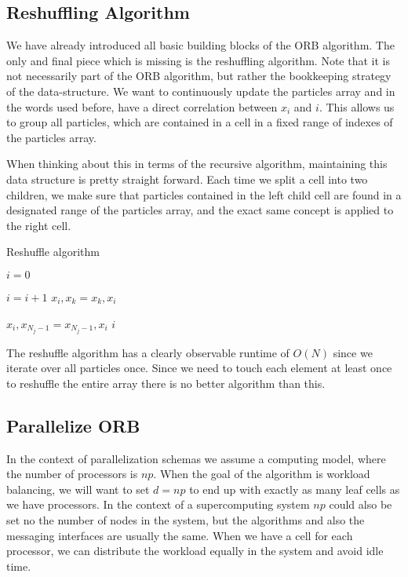\documentclass[]{article}
\begin{document}
\subsection{Reshuffling Algorithm}

We have already introduced all basic building blocks of the ORB algorithm. The only and final piece which is missing is the reshuffling algorithm. Note that it is not necessarily part of the ORB algorithm, but rather the bookkeeping strategy of the data-structure. We want to continuously update the particles array and in the words used before, have a direct correlation between $x_i$ and $i$. This allows us to group all particles, which are contained in a cell in a fixed range of indexes of the particles array. 

When thinking about this in terms of the recursive algorithm, maintaining this data structure is pretty straight forward. Each time we split a cell into two children, we make sure that particles contained in the left child cell are found in a designated range of the particles array, and the exact same concept is applied to the right cell.

\begin{algorithm}[H]
	\caption{Reshuffle algorithm}\label{euclid}
	\begin{algorithmic}[1]
		\State $i = 0$
		
		\State $i = i + 1$
		\State $x_{i}, x_{k} = x_{k}, x_{i}$
		\EndIf
		\EndFor
		
		\State $ x_{i}, x_{N_j-1} = x_{N_j-1}, x_{i}$
		\State \Return $i$
		\EndProcedure
	\end{algorithmic}
\end{algorithm}

The reshuffle algorithm has a clearly observable runtime of $O(N)$ since we iterate over all particles once. Since we need to touch each element at least once to reshuffle the entire array there is no better algorithm than this.


\subsection{Parallelize ORB }

In the context of parallelization schemas we assume a computing model, where the number of processors is $np$. When the goal of the algorithm is workload balancing, we will want to set $d = np$ to end up with exactly as many leaf cells as we have processors. In the context of a supercomputing system $np$ could also be set no the number of nodes in the system, but the algorithms and also the messaging interfaces are usually the same. 
When we have a cell for each processor, we can distribute the workload equally in the system and avoid idle time.
\end{document}
